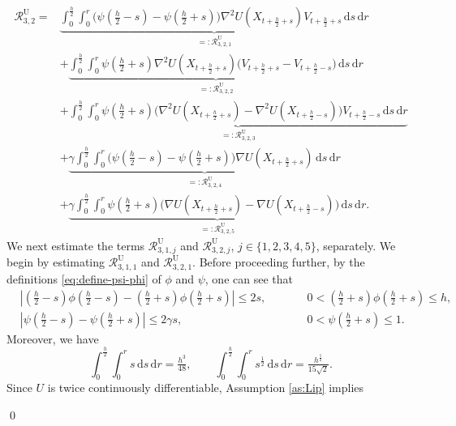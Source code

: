 \documentclass[12pt]{article}
\newenvironment{redtext}
  {\color{black}\ignorespaces}
  {\ignorespacesafterend}
\numberwithin{equation}{section}
\renewenvironment{proof}%
  {\begin{trivlist}%
   \item[]\ignorespaces}%
  {\qed\end{trivlist}}
\newcommand{\dd}{\mathrm{d}}
\begin{document}
\begin{redtext}
\begin{proof}
\begin{align}
\mathcal R^{\mathrm{U}}_{3,2}
={}&
\underbrace{
\int_0^{\frac h2}\int_0^r
\Big(
\psi(\tfrac h2-s)
-
\psi(\tfrac h2+s)
\Big)
\nabla^2U(X_{t+\frac h2+s})
V_{t+\frac h2+s}
\,\dd s\,\dd r
}_{=:\mathcal R^{\mathrm{U}}_{3,2,1}}
\nonumber\\
&+
\underbrace{
\int_0^{\frac h2}\int_0^r
\psi(\tfrac h2+s)
\nabla^2U(X_{t+\frac h2+s})
\Big(
V_{t+\frac h2+s}
-
V_{t+\frac h2-s}
\Big)
\,\dd s\,\dd r
}_{=:\mathcal R^{\mathrm{U}}_{3,2,2}}
\nonumber\\
&+
\underbrace{
\int_0^{\frac h2}\int_0^r
\psi(\tfrac h2+s)
\Big(
\nabla^2U(X_{t+\frac h2+s})
-
\nabla^2U(X_{t+\frac h2-s})
\Big)
V_{t+\frac h2-s}
\,\dd s\,\dd r
}_{=:\mathcal R^{\mathrm{U}}_{3,2,3}}
\nonumber\\
&+
\underbrace{
\gamma
\int_0^{\frac h2}\int_0^r
\Big(
\psi(\tfrac h2-s)
-
\psi(\tfrac h2+s)
\Big)
\nabla U(X_{t+\frac h2+s})
\,\dd s\,\dd r
}_{=:\mathcal R^{\mathrm{U}}_{3,2,4}}
\nonumber\\
&+
\underbrace{
\gamma
\int_0^{\frac h2}\int_0^r
\psi(\tfrac h2+s)
\Big(
\nabla U(X_{t+\frac h2+s})
-
\nabla U(X_{t+\frac h2-s})
\Big)
\,\dd s\,\dd r
}_{=:\mathcal R^{\mathrm{U}}_{3,2,5}}.
\label{eq:R3-second-component-decomposition}
\end{align}
We next estimate the terms
$\mathcal R_{3,1,j}^{\mathrm U}$ and
$\mathcal R_{3,2,j}^{\mathrm U}$,
$j\in\{1,2,3,4,5\}$, separately. We begin by estimating
$\mathcal R_{3,1,1}^{\mathrm U}$ and
$\mathcal R_{3,2,1}^{\mathrm U}$. Before proceeding further, by the definitions \eqref{eq:define-psi-phi} of \(\phi\)  and \(\psi\), one can see that
\begin{align}
&
\left|
\left(\tfrac h2-s\right)
\phi\left(\tfrac h2-s\right)
-
\left(\tfrac h2+s\right)
\phi\left(\tfrac h2+s\right)
\right|
\leq 2s,
\qquad 
&&0<
\left(\tfrac h2+s\right)
\phi\left(\tfrac h2+s\right)
\leq h,
\label{eq:UBU-kernel2-elementary-bounds}
\\
&
\left|
\psi\left(\tfrac h2-s\right)
-
\psi\left(\tfrac h2+s\right)
\right|
\leq2\gamma s,
\qquad
&& 
0<
\psi\left(\tfrac h2+s\right)
\leq 1.
\label{eq:UBU-kernel1-elementary-bounds}
\end{align}
Moreover, we have 
\begin{equation}
\label{eq:multi-integral}
\int_0^{\frac h2}\int_0^r s\,\dd s\,\dd r
=
\tfrac{h^3}{48},
\qquad
\int_0^{\frac h2}\int_0^r s^{\frac12}\,\dd s\,\dd r
=
\tfrac{h^{\frac52}}{15\sqrt2}.
\end{equation}
Since \(U\) is twice continuously differentiable, Assumption
\ref{as:Lip} implies

\end{proof}
\end{redtext}
\end{document}
